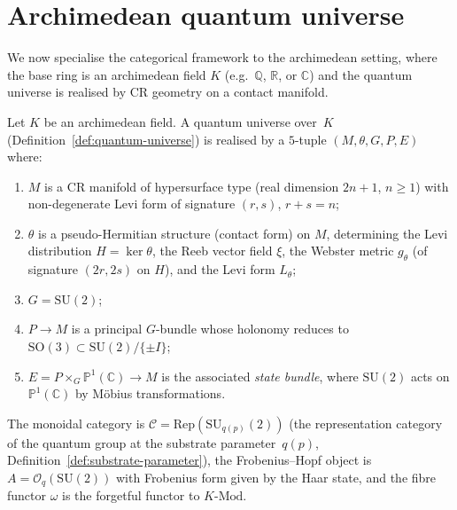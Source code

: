 
\section{Archimedean quantum universe}
\label{sec:archimedean-qou}

We now specialise the categorical framework to the archimedean setting,
where the base ring is an archimedean field $K$ (e.g.\
$\mathbb{Q}$, $\mathbb{R}$, or $\mathbb{C}$) and the quantum universe
is realised by CR geometry on a contact manifold.

\begin{example}
\label{def:c-quantum-universe}
\leanok
Let $K$ be an archimedean field.  A quantum universe over~$K$
(Definition~\ref{def:quantum-universe}) is realised by a $5$-tuple
$(M, \theta, G, P, E)$ where:
\begin{enumerate}
  \item $M$ is a CR manifold of hypersurface type
        (real dimension $2n+1$, $n \geq 1$) with non-degenerate Levi form
        of signature $(r,s)$, $r + s = n$;
  \item $\theta$ is a pseudo-Hermitian structure (contact form) on $M$,
        determining the Levi distribution $H = \ker\theta$, the Reeb vector
        field $\xi$, the Webster metric $g_\theta$ (of signature $(2r,2s)$
        on $H$), and the Levi form $L_\theta$;
  \item $G = \mathrm{SU}(2)$;
  \item $P \to M$ is a principal $G$-bundle whose holonomy reduces to
        $\mathrm{SO}(3) \subset \mathrm{SU}(2)/\{\pm I\}$;
  \item $E = P \times_G \mathbb{P}^1(\mathbb{C}) \to M$ is the associated
        \emph{state bundle}, where $\mathrm{SU}(2)$ acts on
        $\mathbb{P}^1(\mathbb{C})$ by M\"obius transformations.
\end{enumerate}
The monoidal category is $\mathcal{C} = \mathrm{Rep}(\mathrm{SU}_{q(p)}(2))$
(the representation category of the quantum group at the substrate
parameter~$q(p)$, Definition~\ref{def:substrate-parameter}), the
Frobenius--Hopf object is
$A = \mathcal{O}_q(\mathrm{SU}(2))$ with Frobenius form given by the
Haar state, and the fibre functor $\omega$ is the forgetful functor
to $K\text{-}\mathrm{Mod}$.
\end{example}

